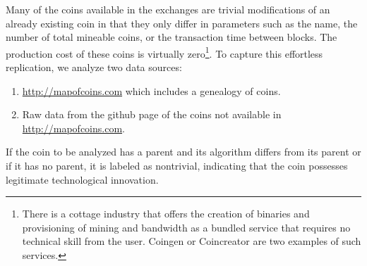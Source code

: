 Many of the coins available in the exchanges are trivial modifications of an already existing coin in that they only differ in parameters such as the name, the number of total mineable coins, or the transaction time between blocks.
The production cost of these coins is virtually zero\footnote{There is a cottage industry that offers the creation of binaries and provisioning of mining and bandwidth as a bundled service that requires no technical skill from the user. Coingen or Coincreator are two examples of such services.}. To capture this effortless replication, we analyze two data sources:
\begin{enumerate}[topsep=0pt,itemsep=-0.5ex,partopsep=1ex,parsep=1ex]
 \item  \url{http://mapofcoins.com} which includes a genealogy of coins.
 \item Raw data from the github page of the coins not available in \url{http://mapofcoins.com}.
\end{enumerate}
If the coin to be analyzed has a parent and its algorithm differs from its parent or if it has no parent, it is labeled as nontrivial, indicating that the coin possesses legitimate technological innovation.
